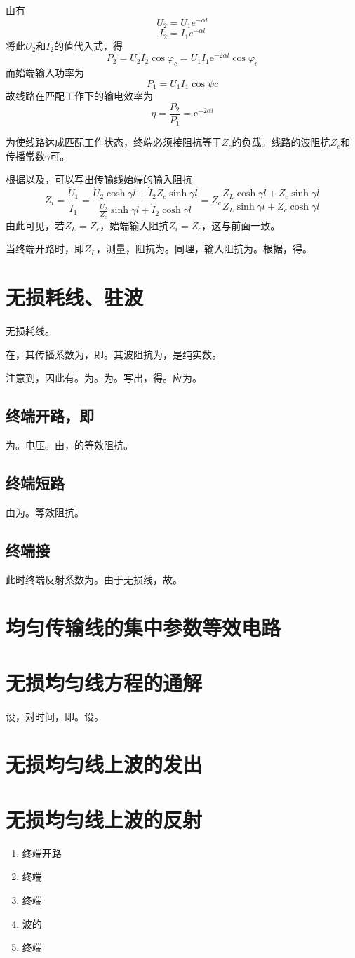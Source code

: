 由有
\[
U_2=U_1e^{-\alpha l}
\]
\[
I_2=I_1e^{-\alpha l}
\]
将此$U_2$和$I_2$的值代入式，得
\[
P_2 = U_2 I_2 \cos\varphi_c = U_1 I_1 \mathrm{e}^{-2\alpha l} \cos\varphi_c
\]
而始端输入功率为
\[
P_1=U_1I_1\cos{\psi c}
\]
故线路在匹配工作下的输电效率为
\[
\eta = \frac{P_2}{P_1} = \mathrm{e}^{-2\alpha l}
\]

为使线路达成匹配工作状态，终端必须接阻抗等于$Z_c$的负载。线路的波阻抗$Z_c$和传播常数$\gamma$可。

根据以及，可以写出传输线始端的输入阻抗
\[
Z_i = \frac{\dot{U}_1}{\dot{I}_1} = \frac{\dot{U}_2 \cosh \gamma l + \dot{I}_2 Z_c \sinh \gamma l}{\frac{\dot{U}_2}{Z_c} \sinh \gamma l + \dot{I}_2 \cosh \gamma l} = Z_c \frac{Z_L \cosh \gamma l + Z_c \sinh \gamma l}{Z_L \sinh \gamma l + Z_c \cosh \gamma l}
\]
由此可见，若$Z_L=Z_c$，始端输入阻抗$Z_i=Z_c$，这与前面一致。

当终端开路时，即$Z_L$，测量，阻抗为。同理，输入阻抗为。根据，得。

\section{无损耗线、驻波}
无损耗线。

在，其传播系数为，即。其波阻抗为，是纯实数。

注意到，因此有。为。为。写出，得。应为。

\subsection{终端开路，即}
为。电压。由，的等效阻抗。

\subsection{终端短路}
由为。等效阻抗。

\subsection{终端接}
此时终端反射系数为。由于无损线，故。

\section{均匀传输线的集中参数等效电路}

\section{无损均匀线方程的通解}
设，对时间，即。设。

\section{无损均匀线上波的发出}

\section{无损均匀线上波的反射}
\begin{enumerate}
    \item 终端开路
    \item 终端
    \item 终端
    \item 波的
    \item 终端
\end{enumerate}

\endinput